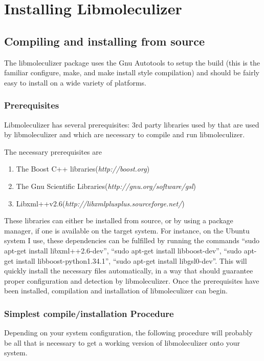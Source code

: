 \chapter{Installing Libmoleculizer}
\label{chap:installingChapter}

\section{Compiling and installing from source}
The libmoleculizer package uses the Gnu Autotools to setup the build
(this is the familiar configure, make, and make install style
compilation) and should be fairly easy to install on a wide variety of
platforms.

\subsection{Prerequisites}
Libmoleculizer has several prerequisites: 3rd party libraries used by
that are used by libmoleculizer and which are necessary to compile and
run libmoleculizer.

The necessary prerequisites are
\begin{enumerate}
\item The Boost C++ libraries(\emph{http://boost.org})
\item The Gnu Scientific Libraries(\emph{http://gnu.org/software/gsl})
\item Libxml++v2.6(\emph{http://libxmlplusplus.sourceforge.net/})
\end{enumerate}

These libraries can either be installed from source, or by using a
package manager, if one is available on the target system.  For
instance, on the Ubuntu system I use, these dependencies can be
fulfilled by running the commands ``sudo apt-get install
libxml++2.6-dev'', ``sudo apt-get install libboost-dev'', ``sudo apt-get
install libboost-python1.34.1'', ``sudo apt-get install
libgsl0-dev''.  This will quickly install the necessary files
automatically, in a way that should guarantee proper configuration and
detection by libmoleculizer.  Once the prerequisites have been
installed, compilation and installation of libmoleculizer can begin.



\subsection{Simplest compile/installation Procedure}
Depending on your system configuration, the following procedure will
probably be all that is necessary to get a working version of
libmoleculizer onto your system.

